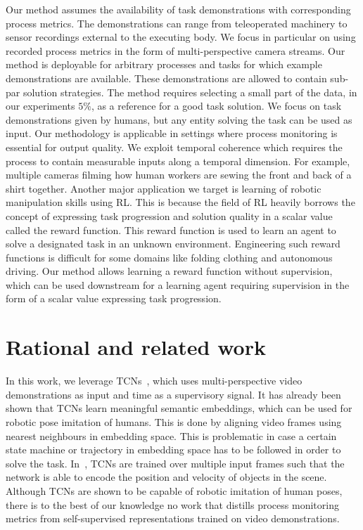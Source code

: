 \documentclass[\home/main.tex]{subfiles}
\begin{document}
Our method assumes the availability of task demonstrations with corresponding process metrics. The demonstrations can range from teleoperated machinery to sensor recordings external to the executing body. We focus in particular on using recorded process metrics in the form of multi-perspective camera streams. Our method is deployable for arbitrary processes and tasks for which example demonstrations are available. These demonstrations are allowed to contain sub-par solution strategies. The method requires selecting a small part of the data, in our experiments $5\%$, as a reference for a good task solution. We focus on task demonstrations given by humans, but any entity solving the task can be used as input. Our methodology is applicable in settings where process monitoring is essential for output quality. We exploit temporal coherence which requires the process to contain measurable inputs along a temporal dimension.
For example, multiple cameras filming how human workers are sewing the front and back of a shirt together.
Another major application we target is learning of robotic manipulation skills using RL. This is because the field of RL heavily borrows the concept of expressing task progression and solution quality in a scalar value called the reward function. This reward function is used to learn an agent to solve a designated task in an unknown environment. Engineering such reward functions is difficult for some domains like folding clothing and autonomous driving. Our method allows learning a reward function without supervision, which can be used downstream for a learning agent requiring supervision in the form of a scalar value expressing task progression.

\section{Rational and related work}



In this work, we leverage TCNs~\cite{Sermanet2017TCN}, which uses multi-perspective video demonstrations as input and time as a supervisory signal. It has already been shown that TCNs learn meaningful semantic embeddings, which can be used for robotic pose imitation of humans. This is done by aligning video frames using nearest neighbours in embedding space. This is problematic in case a certain state machine or trajectory in embedding space has to be followed in order to solve the task. In~\cite{Dwibedi2018mfTCN}, TCNs are trained over multiple input frames such that the network is able to encode the position and velocity of objects in the scene. Although TCNs are shown to be capable of robotic imitation of human poses, there is to the best of our knowledge no work that distills process monitoring metrics from self-supervised representations trained on video demonstrations. %
\end{document}
